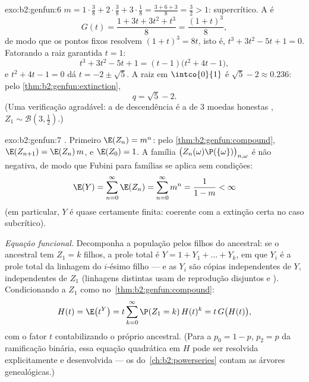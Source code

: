 \begin{solution}{exo:b2:genfun:6}
$m = 1\cdot\frac38 + 2\cdot\frac38 + 3\cdot\frac18 = \frac{3 + 6 +
3}{8} = \frac32 > 1$: supercrítico. A  é
\[
G(t) = \frac{1 + 3t + 3t^2 + t^3}{8} = \frac{(1 + t)^3}{8} ,
\]
de modo que os pontos fixos resolvem $(1 + t)^3 = 8t$, isto é, $t^3 + 3t^2 - 5t + 1
= 0$. Fatorando a raiz garantida $t = 1$:
\[
t^3 + 3t^2 - 5t + 1 = (t - 1)\bigl(t^2 + 4t - 1\bigr),
\]
e $t^2 + 4t - 1 = 0$ dá $t = -2 \pm \sqrt5$. A raiz em
$\intco{0}{1}$ é $\sqrt5 - 2 \approx 0.236$: pelo
\cref{thm:b2:genfun:extinction},
\[
q = \sqrt 5 - 2 .
\]
(Uma verificação agradável: a  de descendência é a de $3$ moedas honestas
, $Z_1 \sim \mathcal{B}(3, \frac12)$.)
\end{solution}

\begin{solution}{exo:b2:genfun:7}
\emph{.} Primeiro $\E(Z_n) = m^n$: pelo
\cref{thm:b2:genfun:compound}, $\E(Z_{n+1}) = \E(Z_n)\,m$, e
$\E(Z_0) = 1$. A família $\bigl(Z_n(\omega)\P(\{\omega\})
\bigr)_{n, \omega}$ é não negativa, de modo que Fubini para famílias se aplica
sem condições:
\[
\E(Y) = \sum_{n=0}^{\infty}\E(Z_n)
= \sum_{n=0}^\infty m^n = \frac{1}{1 - m} < \infty
\]
(em particular, $Y$ é quase certamente finita: coerente com a
extinção certa no caso subcrítico).

\emph{Equação funcional.} Decomponha a população pelos filhos do
ancestral: se o ancestral tem $Z_1 = k$ filhos, a
prole total é $Y = 1 + Y_1 + \dots + Y_k$, em que $Y_i$ é a
prole total da linhagem do $i$-ésimo filho --- e as $Y_i$ são
cópias independentes de $Y$, independentes de $Z_1$ (linhagens distintas
usam  de reprodução disjuntos e ). Condicionando a
$Z_1$ como no~\cref{thm:b2:genfun:compound}:
\[
H(t) = \E\bigl(t^Y\bigr)
= t\sum_{k=0}^\infty \P(Z_1 = k)\,H(t)^k
= t\,G\bigl(H(t)\bigr),
\]
com o fator $t$ contabilizando o próprio ancestral. (Para a
 $p_0 = 1 - p$, $p_2 = p$ da ramificação binária, essa equação
quadrática em $H$ pode ser resolvida explicitamente e desenvolvida --- os
 do~\cref{ch:b2:powerseries} contam as árvores
genealógicas.)
\end{solution}


